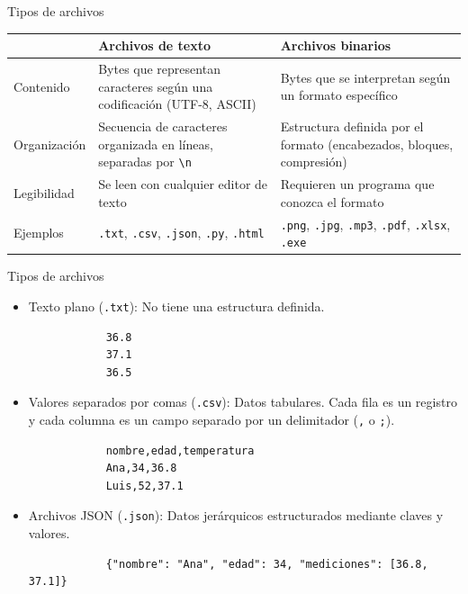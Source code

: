 \documentclass{beamer}
\begin{document}
    \begin{frame}[fragile, t]{Tipos de archivos}
        \renewcommand{\arraystretch}{1.35}
        \begin{center}
            \scriptsize
            \begin{tabular}{@{}p{2cm}p{4cm}p{4cm}@{}}
                \toprule
                & \textbf{Archivos de texto} & \textbf{Archivos binarios} \\
                \midrule
                Contenido &
                Bytes que representan caracteres según una codificación (UTF-8, ASCII) &
                Bytes que se interpretan según un formato específico \\
                Organización &
                Secuencia de caracteres organizada en líneas, separadas por \texttt{\textbackslash n} &
                Estructura definida por el formato (encabezados, bloques, compresión) \\
                Legibilidad &
                Se leen con cualquier editor de texto &
                Requieren un programa que conozca el formato \\
                Ejemplos &
                \texttt{.txt}, \texttt{.csv}, \texttt{.json}, \texttt{.py}, \texttt{.html} &
                \texttt{.png}, \texttt{.jpg}, \texttt{.mp3}, \texttt{.pdf}, \texttt{.xlsx}, \texttt{.exe} \\
                \bottomrule
            \end{tabular}
        \end{center}
    \end{frame}

    \begin{frame}[fragile, t]{Tipos de archivos}
        \begin{itemize}
            \item Texto plano (\texttt{.txt}): No tiene una estructura definida.
            \begin{verbatim}
            36.8
            37.1
            36.5
            \end{verbatim}
            \pause
            \item Valores separados por comas (\texttt{.csv}): Datos tabulares. Cada fila es un registro y cada columna es un campo separado por un delimitador (\texttt{,} o \texttt{;}).
            \begin{verbatim}
            nombre,edad,temperatura
            Ana,34,36.8
            Luis,52,37.1
            \end{verbatim}
            \pause
            \item Archivos JSON (\texttt{.json}): Datos jerárquicos estructurados mediante claves y valores.
            \begin{verbatim}
            {"nombre": "Ana", "edad": 34, "mediciones": [36.8, 37.1]}
            \end{verbatim}
        \end{itemize}
    \end{frame}
\end{document}
